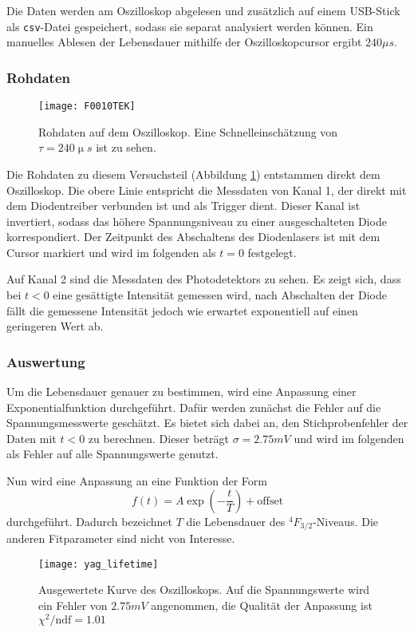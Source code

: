 \documentclass{../Misc/MontavonLaTeX/Montavon}
\newcommand{\halfwidth}{0.48\textwidth}
\begin{document}
Die Daten werden am Oszilloskop abgelesen und zusätzlich auf einem USB-Stick als \texttt{csv}-Datei gespeichert, sodass sie separat analysiert werden können. Ein manuelles Ablesen der Lebensdauer mithilfe der Oszilloskopcursor ergibt $240 \unit{\mu s}$. 

\subsubsection{Rohdaten}
\begin{figure}[htbp]
\centering
\texttt{[image: F0010TEK]}
\caption{Rohdaten auf dem Oszilloskop. Eine Schnelleinschätzung von $\tau = 240 \unit{\upmu s}$ ist zu sehen.}
\label{fig:lebensdauer_oszi}
\end{figure}

Die Rohdaten zu diesem Versuchsteil (Abbildung \ref{fig:lebensdauer_oszi}) entstammen direkt dem Oszilloskop. Die obere Linie entspricht die Messdaten von Kanal 1, der direkt mit dem Diodentreiber verbunden ist und als Trigger dient. Dieser Kanal ist invertiert, sodass das höhere Spannungsniveau zu einer ausgeschalteten Diode korrespondiert. Der Zeitpunkt des Abschaltens des Diodenlasers ist mit dem Cursor markiert und wird im folgenden als $t = 0$ festgelegt.

Auf Kanal 2 sind die Messdaten des Photodetektors zu sehen. Es zeigt sich, dass bei $t < 0$ eine gesättigte Intensität gemessen wird, nach Abschalten der Diode fällt die gemessene Intensität jedoch wie erwartet exponentiell auf einen geringeren Wert ab.

\subsubsection{Auswertung}
Um die Lebensdauer genauer zu bestimmen, wird eine Anpassung einer Exponentialfunktion durchgeführt. Dafür werden zunächst die Fehler auf die Spannungsmesswerte geschätzt. Es bietet sich dabei an, den Stichprobenfehler der Daten mit $t < 0$ zu berechnen. Dieser beträgt $\sigma = 2.75 \unit{mV}$ und wird im folgenden als Fehler auf alle Spannungswerte genutzt.

Nun wird eine Anpassung an eine Funktion der Form 
\[ f(t) = A \exp\left(-\frac{t}{T}\right) + \textrm{offset} \] durchgeführt. Dadurch bezeichnet $T$ die Lebensdauer des $^4F_{3/2}$-Niveaus. Die anderen Fitparameter sind nicht von Interesse.

\begin{figure}[htbp]
\centering
\texttt{[image: yag\_lifetime]}
\caption{Ausgewertete Kurve des Oszilloskops. Auf die Spannungswerte wird ein Fehler von $2.75 \unit{mV}$ angenommen, die Qualität der Anpassung ist $\chi^2 / \textrm{ndf} = 1.01$}
\label{fig:lebensdauer_fit}
\end{figure}
\end{document}
